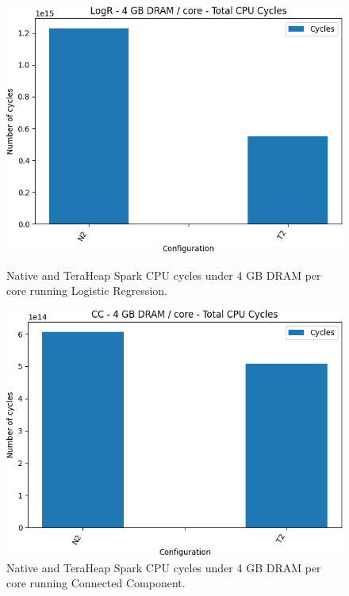 \begin{figure}[thbp]
        \centering
        \includegraphics[width=\linewidth]{./fig/logr32_cycles.png}
    \caption{Native and TeraHeap Spark CPU cycles under 4 GB DRAM per core running Logistic Regression.}
                \label{fig:logr32_cycles}

        \includegraphics[width=\linewidth]{./fig/cc32_cycles.png}
    \caption{Native and TeraHeap Spark CPU cycles under 4 GB DRAM per core running Connected Component.}
                \label{fig:cc32_cycles}
\end{figure}


